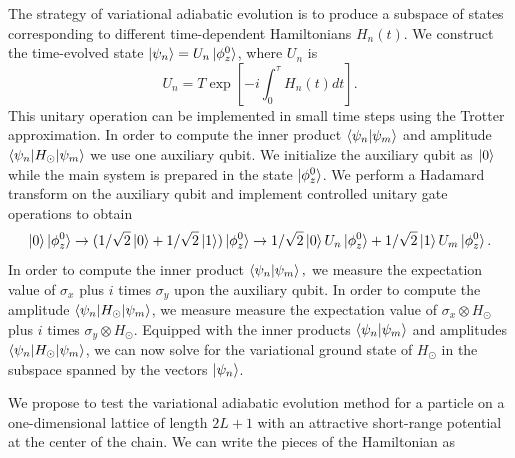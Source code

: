 \documentclass[10pt]{article}
\begin{document}
The strategy of variational adiabatic evolution is to produce a
subspace of states corresponding to different time-dependent
Hamiltonians $H_{n}(t)$.  We construct the time-evolved state
$\ket{\psi_n} = U_n\ket{\phi_z^0}$, where $U_n$ is
\begin{equation}
U_n = T \exp\left[-i\int_0^\tau H_n(t) dt \right] \label{adiabatic}.
\end{equation}
 This unitary operation can be implemented in small time steps using
 the Trotter approximation. In order to compute the inner product
 $\braket{\psi_n|\psi_m}$ and amplitude
 $\braket{\psi_n|H_\odot|\psi_m}$ we use one auxiliary qubit.  We
 initialize the auxiliary qubit as $\ket{0}$ while the main system is
 prepared in the state $\ket{\phi_z^0}$.  We perform a Hadamard
 transform on the auxiliary qubit and implement controlled unitary
 gate operations to obtain
\begin{equation}
\ket{0}\ket{\phi_z^0} \rightarrow (1/\sqrt{2}\ket{0} +1/\sqrt{2}\ket{1})\ket{\phi_z^0}
\rightarrow 1/\sqrt{2}\ket{0}U_n\ket{\phi_z^0} +1/\sqrt{2}\ket{1}U_m\ket{\phi_z^0}.
\end{equation}
In order to compute the inner product $\braket{\psi_n|\psi_m},$ we
measure the expectation value of $\sigma_x$ plus $i$ times $\sigma_y$
upon the auxiliary qubit.  In order to compute the amplitude
$\braket{\psi_n|H_\odot|\psi_m}$, we measure measure the expectation
value of $\sigma_x \otimes H_\odot$ plus $i$ times $\sigma_y \otimes
H_\odot$.  Equipped with the inner products $\braket{\psi_n|\psi_m}$
and amplitudes $\braket{\psi_n|H_\odot|\psi_m}$, we can now solve for
the variational ground state of $H_\odot$ in the subspace spanned by
the vectors $\ket{\psi_n}$.

We propose to test the variational adiabatic evolution method for a
particle on a one-dimensional lattice of length $2L+1$ with an
attractive short-range potential at the center of the chain.  We can
write the pieces of the Hamiltonian as
\end{document}
